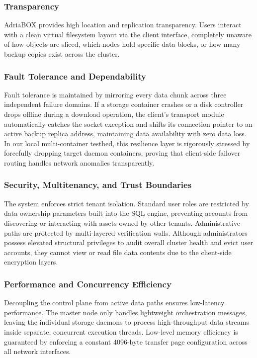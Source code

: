 \subsubsection{Transparency}
AdriaBOX provides high location and replication transparency. Users interact with a clean virtual filesystem layout via the client interface, completely unaware of how objects are sliced, which nodes hold specific data blocks, or how many backup copies exist across the cluster.

\subsubsection{Fault Tolerance and Dependability}
Fault tolerance is maintained by mirroring every data chunk across three independent failure domains. If a storage container crashes or a disk controller drops offline during a download operation, the client's transport module automatically catches the socket exception and shifts its connection pointer to an active backup replica address, maintaining data availability with zero data loss. In our local multi-container testbed, this resilience layer is rigorously stressed by forcefully dropping target daemon containers, proving that client-side failover routing handles network anomalies transparently.

\subsubsection{Security, Multitenancy, and Trust Boundaries}
The system enforces strict tenant isolation. Standard user roles are restricted by data ownership parameters built into the SQL engine, preventing accounts from discovering or interacting with assets owned by other tenants. Administrative paths are protected by multi-layered verification walls. Although administrators possess elevated structural privileges to audit overall cluster health and evict user accounts, they cannot view or read file data contents due to the client-side encryption layers.

\subsubsection{Performance and Concurrency Efficiency}
Decoupling the control plane from active data paths ensures low-latency performance. The master node only handles lightweight orchestration messages, leaving the individual storage daemons to process high-throughput data streams inside separate, concurrent execution threads. Low-level memory efficiency is guaranteed by enforcing a constant 4096-byte transfer page configuration across all network interfaces.

